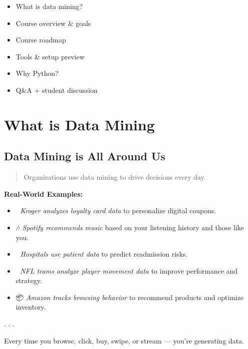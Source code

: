 \documentclass[
  letterpaper,
  DIV=11,
  numbers=noendperiod]{scrartcl}
\providecommand{\tightlist}{%
  \setlength{\itemsep}{0pt}\setlength{\parskip}{0pt}}
\begin{document}
\begin{itemize}
\tightlist
\item
  What is data mining?
\item
  Course overview \& goals
\item
  Course roadmap
\item
  Tools \& setup preview
\item
  Why Python?
\item
  Q\&A + student discussion
\end{itemize}

\section{What is Data Mining}\label{what-is-data-mining}

\subsection{Data Mining is All Around
Us}\label{data-mining-is-all-around-us}

\begin{quote}
Organizations use data mining to drive decisions every day.
\end{quote}

\textbf{Real-World Examples:}

\begin{itemize}
\tightlist
\item
  🛒 \emph{Kroger analyzes loyalty card data} to personalize digital
  coupons.
\item
  🎶 \emph{Spotify recommends music} based on your listening history and
  those like you.
\item
  🏥 \emph{Hospitals use patient data} to predict readmission risks.
\item
  🏈 \emph{NFL teams analyze player movement data} to improve
  performance and strategy.
\item
  📦 \emph{Amazon tracks browsing behavior} to recommend products and
  optimize inventory.
\end{itemize}

. . .

\begin{tcolorbox}[enhanced jigsaw, colbacktitle=quarto-callout-important-color!10!white, opacityback=0, colback=white, opacitybacktitle=0.6, toptitle=1mm, left=2mm, bottomrule=.15mm, breakable, bottomtitle=1mm, rightrule=.15mm, titlerule=0mm, title=\textcolor{quarto-callout-important-color}{\faExclamation}\hspace{0.5em}{Important}, coltitle=black, colframe=quarto-callout-important-color-frame, arc=.35mm, toprule=.15mm, leftrule=.75mm]

{Every time you browse, click, buy, swipe, or stream --- you're
generating data.}

\end{tcolorbox}
\end{document}
